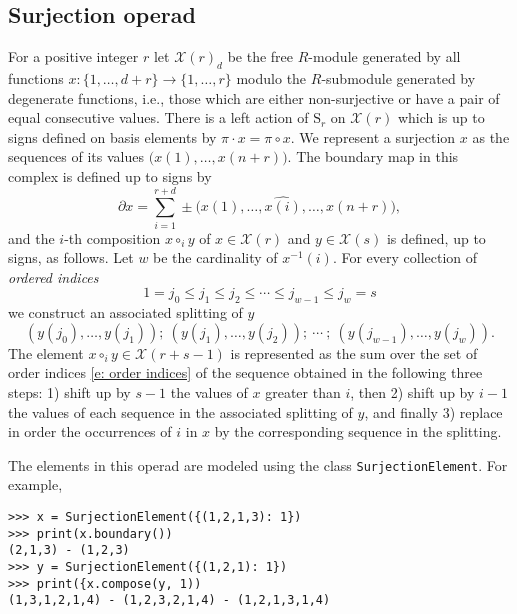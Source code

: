 \documentclass{amsart}
\newcommand{\X}{\mathcal X}
\begin{document}
\subsection{Surjection operad}

For a positive integer $r$ let $\mathcal X(r)_d$ be the free $R$-module generated by all functions $x : \{1, \dots, d+r\} \to \{1, \dots, r\}$ modulo the $R$-submodule generated by degenerate functions, i.e., those which are either non-surjective or have a pair of equal consecutive values. There is a left action of $\mathrm S_r$ on $\mathcal X(r)$ which is up to signs defined on basis elements by $\pi \cdot x = \pi \circ x$.
We represent a surjection $x$ as the sequences of its values $\big( x(1), \dots, x(n+r) \big)$. The boundary map in this complex is defined up to signs by
\begin{equation*}
\partial x = \sum_{i = 1}^{r+d} \pm \big( x(1), \dots, \widehat{x(i)}, \dots, x(n+r) \big),
\end{equation*}
and the $i$-th composition $x \circ_i y$ of $x \in \mathcal X(r)$ and $y \in \mathcal X(s)$ is defined, up to signs, as follows. Let $w$ be the cardinality of $x^{-1}(i)$. For every collection of \textit{ordered indices}
\begin{equation} \label{e: order indices}
1 = j_0 \leq j_1 \leq j_2 \leq \cdots \leq j_{w-1} \leq j_w = s
\end{equation}
we construct an associated splitting of $y$
\begin{equation*}
(y(j_0), \dots, y(j_1));\ (y(j_1), \dots, y(j_2));\ \cdots \ ;\ (y(j_{w-1}), \dots, y(j_w)).
\end{equation*}
The element $x \circ_i y \in \X(r+s-1)$ is represented as the sum over the set of order indices \eqref{e: order indices} of the sequence obtained in the following three steps: 1) shift up by $s-1$ the values of $x$ greater than $i$, then 2) shift up by $i-1$ the values of each sequence in the associated splitting of $y$, and finally 3) replace in order the occurrences of $i$ in $x$ by the corresponding sequence in the splitting.

The elements in this operad are modeled using the class \texttt{SurjectionElement}. For example,
\begin{Verbatim}[frame=single]
>>> x = SurjectionElement({(1,2,1,3): 1})
>>> print(x.boundary())
(2,1,3) - (1,2,3)
>>> y = SurjectionElement({(1,2,1): 1})
>>> print({x.compose(y, 1))
(1,3,1,2,1,4) - (1,2,3,2,1,4) - (1,2,1,3,1,4)
\end{Verbatim}
\end{document}
